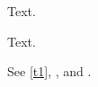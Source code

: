 \documentclass{article}
\begin{document}
\begin{thm}\label{t1}Text.\end{thm}
\begin{lem}\label{l1}Text.\end{lem}
See \autoref{t1}, ,  and .
\end{document}
